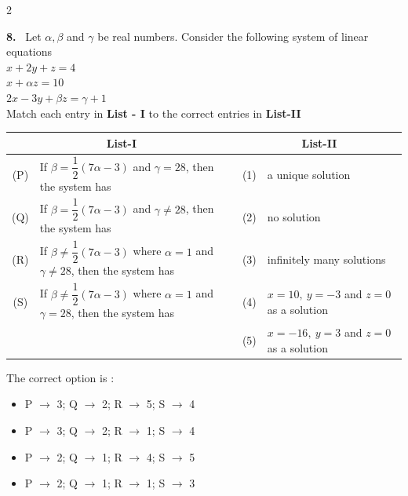 \documentclass[10pt]{extarticle}
\newcommand{\qn}[1]{\par\smallskip\noindent\textbf{#1.}~}
\newenvironment{qoptions}{\begin{itemize}[leftmargin=1.8em,itemsep=1pt,topsep=2pt,label={}]}{\end{itemize}}
\newcommand{\opt}[2]{\item[(#1)] #2}
\begin{document}
\begin{multicols}{2}
\qn{8} Let $\alpha,\beta$ and $\gamma$ be real numbers. Consider the following system of linear equations\\
$x+2y+z=4$\\
$x+\alpha z=10$\\
$2x-3y+\beta z=\gamma+1$\\
Match each entry in \textbf{List - I} to the correct entries in \textbf{List-II}\par\nobreak
\begin{center}\small\setlength{\tabcolsep}{3pt}
\begin{tabular}{|c|p{3.6cm}|c|p{2.1cm}|}
\hline
\multicolumn{2}{|c|}{\textbf{List-I}} & \multicolumn{2}{c|}{\textbf{List-II}} \\
\hline
(P) & If $\beta=\dfrac12(7\alpha-3)$ and $\gamma=28$, then the system has & (1) & a unique solution \\
\hline
(Q) & If $\beta=\dfrac12(7\alpha-3)$ and $\gamma\neq28$, then the system has & (2) & no solution \\
\hline
(R) & If $\beta\neq\dfrac12(7\alpha-3)$ where $\alpha=1$ and $\gamma\neq28$, then the system has & (3) & infinitely many solutions \\
\hline
(S) & If $\beta\neq\dfrac12(7\alpha-3)$ where $\alpha=1$ and $\gamma=28$, then the system has & (4) & $x=10,\ y=-3$ and $z=0$ as a solution \\
\hline
 & & (5) & $x=-16,\ y=3$ and $z=0$ as a solution \\
\hline
\end{tabular}
\end{center}
The correct option is :
\begin{qoptions}
\opt{A}{P $\to$ 3; Q $\to$ 2; R $\to$ 5; S $\to$ 4}
\opt{B}{P $\to$ 3; Q $\to$ 2; R $\to$ 1; S $\to$ 4}
\opt{C}{P $\to$ 2; Q $\to$ 1; R $\to$ 4; S $\to$ 5}
\opt{D}{P $\to$ 2; Q $\to$ 1; R $\to$ 1; S $\to$ 3}
\end{qoptions}


\end{multicols}
\end{document}
